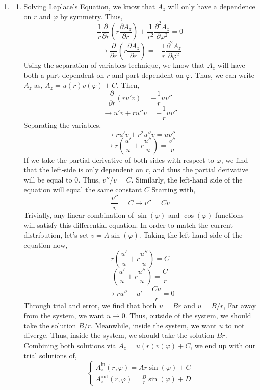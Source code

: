 \documentclass[12pt]{article}
\begin{document}
\begin{enumerate}
	\item [4.3]
	\begin{enumerate}
		\item [a.]
		Solving Laplace's Equation, we know that $A_z$ will only have a dependence on $r$ and $\varphi$ by symmetry.
		Thus,
		\[\frac{1}{r}\frac{\partial}{\partial r}\left(r\frac{\partial A_z}{\partial r}\right)+\frac{1}{r^2}\frac{\partial^2 A_z}{\partial \varphi^2}=0\]
		\[\to \frac{\partial}{\partial r}\left(r\frac{\partial A_z}{\partial r}\right)=-\frac{1}{r}\frac{\partial^2 A_z}{\partial \varphi^2}\]
		Using the separation of variables technique, we know that $A_z$ will have both a part dependent on $r$ and part dependent on $\varphi$.
		Thus, we can write $A_z$ as, $A_z=u(r)v(\varphi)+C$.
		Then,
		\[\frac{\partial}{\partial r}\left(ru'v\right)=-\frac{1}{r}uv''\]
		\[\to u'v + ru''v=-\frac{1}{r}uv''\]
		Separating the variables,
		\[\to ru'v + r^2u''v=uv''\]
		\[\to r\left(\frac{u'}{u}+r\frac{u''}{u}\right)=\frac{v''}{v}\]
		If we take the partial derivative of both sides with respect to $\varphi$, we find that the left-side is only dependent on $r$, and thus the partial derivative will be equal to $0$.
		Thus, $v''/v=C$.
		Similarly, the left-hand side of the equation will equal the same constant $C$
		Starting with,
		\[\frac{v''}{v}=C \to v''=Cv\]
		Trivially, any linear combination of $\sin(\varphi)$ and $\cos(\varphi)$ functions will satisfy this differential equation.
		In order to match the current distribution, let's set $v=A\sin(\varphi)$.
		Taking the left-hand side of the equation now,
		\[r\left(\frac{u'}{u}+r\frac{u''}{u}\right)=C\]
		\[\left(\frac{u'}{u}+r\frac{u''}{u}\right)=\frac{C}{r}\]
		\[\to ru'' + u' - \frac{Cu}{r}=0\]
		Through trial and error, we find that both $u=Br$ and $u=B/r$,
		Far away from the system, we want $u\to 0$.
		Thus, outside of the system, we should take the solution $B/r$.
		Meanwhile, inside the system, we want $u$ to not diverge.
		Thus, inside the system, we should take the solution $Br$.
		Combining both solutions via $A_z=u(r)v(\varphi)+C$, we end up with our trial solutions of,
		\[\boxed{\begin{cases}
			A_z^{\mathrm{in}}(r,\varphi) = Ar\sin(\varphi)+C \\ 
			A_z^{\mathrm{out}}(r,\varphi)=\frac{B}{r}\sin(\varphi)+D
		\end{cases}}\]


\end{enumerate}
\end{enumerate}
\end{document}

